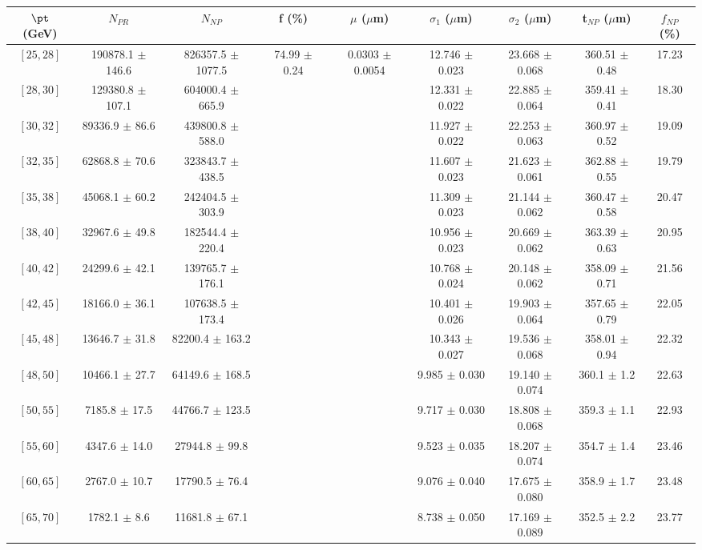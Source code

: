 \begin{tabular}{c||c|c|c|c|c|c|c||c}
$\pt$ (GeV) & $N_{PR}$ & $N_{NP}$ & f (\%) & $\mu$ ($\mu$m) & $\sigma_1$ ($\mu$m) & $\sigma_2$ ($\mu$m)  & t$_{NP}$ ($\mu$m) & $f_{NP}$ (\%) \\
\hline
$[25, 28]$ & 190878.1 $\pm$ 146.6 & 826357.5 $\pm$ 1077.5 & \multirow{19}{*}{74.99 $\pm$ 0.24} & \multirow{19}{*}{0.0303 $\pm$ 0.0054} & 12.746 $\pm$ 0.023 & 23.668 $\pm$ 0.068 & 360.51 $\pm$ 0.48 & 17.23\\
$[28, 30]$ & 129380.8 $\pm$ 107.1 & 604000.4 $\pm$ 665.9 &  &  & 12.331 $\pm$ 0.022 & 22.885 $\pm$ 0.064 & 359.41 $\pm$ 0.41 & 18.30\\
$[30, 32]$ & 89336.9 $\pm$ 86.6 & 439800.8 $\pm$ 588.0 &  &  & 11.927 $\pm$ 0.022 & 22.253 $\pm$ 0.063 & 360.97 $\pm$ 0.52 & 19.09\\
$[32, 35]$ & 62868.8 $\pm$ 70.6 & 323843.7 $\pm$ 438.5 &  &  & 11.607 $\pm$ 0.023 & 21.623 $\pm$ 0.061 & 362.88 $\pm$ 0.55 & 19.79\\
$[35, 38]$ & 45068.1 $\pm$ 60.2 & 242404.5 $\pm$ 303.9 &  &  & 11.309 $\pm$ 0.023 & 21.144 $\pm$ 0.062 & 360.47 $\pm$ 0.58 & 20.47\\
$[38, 40]$ & 32967.6 $\pm$ 49.8 & 182544.4 $\pm$ 220.4 &  &  & 10.956 $\pm$ 0.023 & 20.669 $\pm$ 0.062 & 363.39 $\pm$ 0.63 & 20.95\\
$[40, 42]$ & 24299.6 $\pm$ 42.1 & 139765.7 $\pm$ 176.1 &  &  & 10.768 $\pm$ 0.024 & 20.148 $\pm$ 0.062 & 358.09 $\pm$ 0.71 & 21.56\\
$[42, 45]$ & 18166.0 $\pm$ 36.1 & 107638.5 $\pm$ 173.4 &  &  & 10.401 $\pm$ 0.026 & 19.903 $\pm$ 0.064 & 357.65 $\pm$ 0.79 & 22.05\\
$[45, 48]$ & 13646.7 $\pm$ 31.8 & 82200.4 $\pm$ 163.2 &  &  & 10.343 $\pm$ 0.027 & 19.536 $\pm$ 0.068 & 358.01 $\pm$ 0.94 & 22.32\\
$[48, 50]$ & 10466.1 $\pm$ 27.7 & 64149.6 $\pm$ 168.5 &  &  & 9.985 $\pm$ 0.030 & 19.140 $\pm$ 0.074 & 360.1 $\pm$ 1.2 & 22.63\\
$[50, 55]$ & 7185.8 $\pm$ 17.5 & 44766.7 $\pm$ 123.5 &  &  & 9.717 $\pm$ 0.030 & 18.808 $\pm$ 0.068 & 359.3 $\pm$ 1.1 & 22.93\\
$[55, 60]$ & 4347.6 $\pm$ 14.0 & 27944.8 $\pm$ 99.8 &  &  & 9.523 $\pm$ 0.035 & 18.207 $\pm$ 0.074 & 354.7 $\pm$ 1.4 & 23.46\\
$[60, 65]$ & 2767.0 $\pm$ 10.7 & 17790.5 $\pm$ 76.4 &  &  & 9.076 $\pm$ 0.040 & 17.675 $\pm$ 0.080 & 358.9 $\pm$ 1.7 & 23.48\\
$[65, 70]$ & 1782.1 $\pm$ 8.6 & 11681.8 $\pm$ 67.1 &  &  & 8.738 $\pm$ 0.050 & 17.169 $\pm$ 0.089 & 352.5 $\pm$ 2.2 & 23.77\\

\end{tabular}
